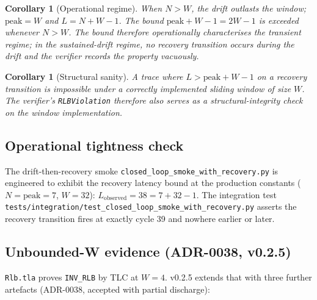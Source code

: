 \documentclass[acmsmall,nonacm=true,review=false]{acmart}
\theoremstyle{plain}
\newtheorem{corollary}[theorem]{Corollary}
\begin{document}
\begin{corollary}[Operational regime]\label{cor:regime}
When $N > W$, the drift outlasts the window; $\mathrm{peak} = W$
and $L = N + W - 1$. The bound $\mathrm{peak} + W - 1 = 2W - 1$ is
exceeded whenever $N > W$. The bound therefore operationally
characterises the \emph{transient} regime; in the sustained-drift
regime, no recovery transition occurs \emph{during the drift} and
the verifier records the property vacuously.
\end{corollary}

\begin{corollary}[Structural sanity]\label{cor:structural}
A trace where $L > \mathrm{peak} + W - 1$ on a recovery transition
is impossible under a correctly implemented sliding window of
size $W$. The verifier's \texttt{RLBViolation} therefore also
serves as a structural-integrity check on the window
implementation.
\end{corollary}

\subsection{Operational tightness check}
The drift-then-recovery smoke
\texttt{closed\_loop\_smoke\_with\_recovery.py} is engineered to
exhibit the recovery latency bound at the production constants
($N = \mathrm{peak} = 7$, $W = 32$):
$L_{\mathrm{observed}} = 38 = 7 + 32 - 1$. The integration test
\texttt{tests/integration/test\_closed\_loop\_smoke\_with\_recovery.py}
asserts the recovery transition fires at exactly cycle 39 and
nowhere earlier or later.

\subsection{Unbounded-W evidence (ADR-0038, v0.2.5)}
\label{sec:rlb-unbounded}

\texttt{Rlb.tla} proves \texttt{INV\_RLB} by TLC at $W = 4$.
v0.2.5 extends that with three further artefacts (ADR-0038,
accepted with partial discharge):
\end{document}
